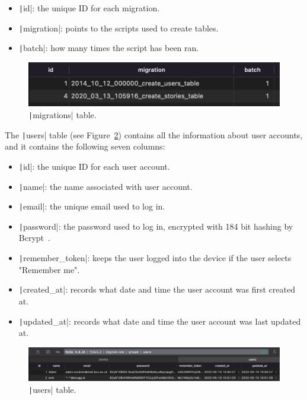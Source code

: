 \begin{itemize}
    \item \texttt|id|: the unique ID for each migration.
    \item \texttt|migration|: points to the scripts used to create tables.
    \item \texttt|batch|: how many times the script has been ran.
\end{itemize}

\begin{figure}[!htbp]
    \centering
    \includegraphics[scale=0.85]{resources/database/migrations-records}
    \caption{\texttt|migrations| table.}
    \label{fig:migrations-records}
\end{figure}

The \texttt|users| table (see Figure~\ref{fig:users-records}) contains all the information about user accounts, and it contains the following seven columns:

\begin{itemize}
    \item \texttt|id|: the unique ID for each user account.
    \item \texttt|name|: the name associated with user account.
    \item \texttt|email|: the unique email used to log in.
    \item \texttt|password|: the password used to log in, encrypted with 184 bit hashing by Bcrypt~\citep{laravel2022hashing}.
    \item \texttt|remember_token|: keeps the user logged into the device if the user selects "Remember me".
    \item \texttt|created_at|: records what date and time the user account was first created at.
    \item \texttt|updated_at|: records what date and time the user account was last updated at.
\end{itemize}

\begin{figure}[!htbp]
    \centering
    \includegraphics[scale=0.4]{resources/database/users-records}
    \caption{\texttt|users| table.}
    \label{fig:users-records}
\end{figure}

